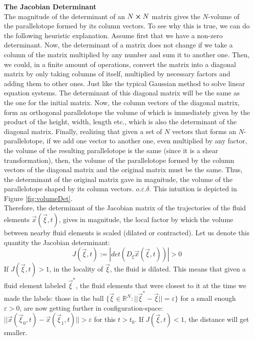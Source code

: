 \documentclass[11pt, a4paper]{article} %
\newcommand{\R}{\mathbb{R}} %
\begin{document}
{{\bf The Jacobian Determinant\vspace{0.2cm}\\}
The magnitude of the determinant of an $N\cross N$ matrix gives the $N$-volume of the parallelotope formed by its column vectors. To see why this is true, we can do the following heuristic explanation. Assume first that we have a non-zero determinant. Now, the determinant of a matrix does not change if we take a column of the matrix multiplied by any number and sum it to another one. Then, we could, in a finite amount of operations, convert the matrix into a diagonal matrix by only taking columns of itself, multiplied by necessary factors and adding them to other ones. Just like the typical Gaussian method to solve linear equation systems. The determinant of this diagonal matrix will be the same as the one for the initial matrix. Now, the column vectors of the diagonal matrix, form an orthogonal parallelotope the volume of which is immediately given by the product of the height, width, length etc., which is also the determinant of the diagonal matrix. Finally, realizing that given a set of $N$ vectors that forms an $N$-parallelotope, if we add one vector to another one, even multiplied by any factor, the volume of the resulting parallelotope is the same (since it is a shear transformation), then, the volume of the parallelotope formed by the column vectors of the diagonal matrix and the original matrix must be the same. Thus, the determinant of the original matrix gave in magnitude, the volume of the parallelotope shaped by its column vectors. $o.\varepsilon.\delta$. This intuition is depicted in Figure \ref{fig:volumeDet}.\\

Therefore, the determinant of the Jacobian matrix of the trajectories of the fluid elements $\vec{x}(\vec{\xi},t)$, gives in magnitude, the local factor by which the volume between nearby fluid elements is scaled (dilated or contracted). Let us denote this quantity the Jacobian determinant:
\begin{equation}
J(\vec{\xi},t):=|det (D_\xi \vec{x}(\vec{\xi},t))|>0
\end{equation}
If $J(\vec{\xi},t)>1$, in the locality of $\vec{\xi}$, the fluid is dilated. This means that given a fluid element labeled $\vec{\xi}^*$, the fluid elements that were closest to it at the time we made the labels: those in the ball $\{\vec{\xi}\in\R^N:||\vec{\xi}^*-\vec{\xi}||=\varepsilon\}$ for a small enough $\varepsilon>0$, are now getting further in configuration-space: $||\vec{x}(\vec{\xi}_0,t)-\vec{x}(\vec{\xi}_1,t)||>\varepsilon$ for this $t>t_0$. If $J(\vec{\xi},t)<1$, the distance will get smaller.}
\end{document}
